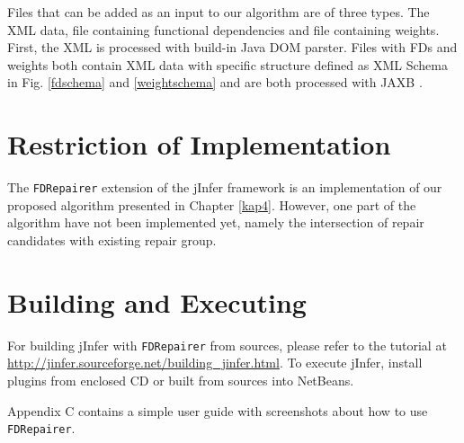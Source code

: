 Files that can be added as an input to our algorithm are of three types. The XML data, file containing functional dependencies and file containing weights. First, the XML is processed with build-in Java DOM parster. Files with FDs and weights both contain XML data with specific structure defined as XML Schema in Fig. \ref{fdschema} and \ref{weightschema} and are both processed with JAXB \cite{JAXB}.


\section{Restriction of Implementation}

The \texttt{FDRepairer} extension of the jInfer framework is an implementation of our proposed algorithm presented in Chapter \ref{kap4}. However, one part of the algorithm have not been implemented yet, namely the intersection of repair candidates with existing repair group.

\section{Building and Executing}

For building jInfer with \texttt{FDRepairer} from sources, please refer to the tutorial at \url{http://jinfer.sourceforge.net/building_jinfer.html}. To execute jInfer, install plugins from enclosed CD or built from sources into NetBeans.

Appendix C contains a simple user guide with screenshots about how to use \texttt{FDRepairer}.
